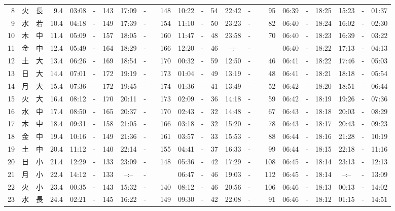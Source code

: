 \documentclass[12pt,a4j]{jsarticle}
\begin{document}
\begin{table}[htbp]
\begin{center}
{\begin{tabular}{|rc|cr|ccrccr|ccrccr|ccc|ccc|}
 8 & 火 & 長 &  9.4 &  03:08 &-& 143 &  17:09 &-& 148 &  10:22 &-&  54 &  22:42 &-&  95 & 06:39 & -& 18:25 & 15:23 & -& 01:37 \\
 9 & 水 & 若 & 10.4 &  04:18 &-& 149 &  17:39 &-& 154 &  11:10 &-&  50 &  23:23 &-&  82 & 06:40 & -& 18:24 & 16:02 & -& 02:30 \\
10 & 木 & 中 & 11.4 &  05:09 &-& 157 &  18:05 &-& 160 &  11:47 &-&  48 &  23:58 &-&  70 & 06:40 & -& 18:23 & 16:39 & -& 03:22 \\
11 & 金 & 中 & 12.4 &  05:49 &-& 164 &  18:29 &-& 166 &  12:20 &-&  46 &  --:-- &-&~~~~~ & 06:40 & -& 18:22 & 17:13 & -& 04:13 \\
12 & 土 & 大 & 13.4 &  06:26 &-& 169 &  18:54 &-& 170 &  00:32 &-&  59 &  12:50 &-&  46 & 06:41 & -& 18:22 & 17:46 & -& 05:03 \\
13 & 日 & 大 & 14.4 &  07:01 &-& 172 &  19:19 &-& 173 &  01:04 &-&  49 &  13:19 &-&  48 & 06:41 & -& 18:21 & 18:18 & -& 05:54 \\
14 & 月 & 大 & 15.4 &  07:36 &-& 172 &  19:45 &-& 174 &  01:36 &-&  41 &  13:49 &-&  52 & 06:42 & -& 18:20 & 18:51 & -& 06:44 \\
15 & 火 & 大 & 16.4 &  08:12 &-& 170 &  20:11 &-& 173 &  02:09 &-&  36 &  14:18 &-&  59 & 06:42 & -& 18:19 & 19:26 & -& 07:36 \\
16 & 水 & 中 & 17.4 &  08:50 &-& 165 &  20:37 &-& 170 &  02:43 &-&  32 &  14:48 &-&  67 & 06:43 & -& 18:18 & 20:03 & -& 08:29 \\
17 & 木 & 中 & 18.4 &  09:31 &-& 158 &  21:05 &-& 166 &  03:18 &-&  32 &  15:20 &-&  78 & 06:43 & -& 18:17 & 20:43 & -& 09:23 \\
18 & 金 & 中 & 19.4 &  10:16 &-& 149 &  21:36 &-& 161 &  03:57 &-&  33 &  15:53 &-&  88 & 06:44 & -& 18:16 & 21:28 & -& 10:19 \\
19 & 土 & 中 & 20.4 &  11:12 &-& 140 &  22:14 &-& 155 &  04:41 &-&  37 &  16:33 &-&  99 & 06:44 & -& 18:15 & 22:18 & -& 11:16 \\
20 & 日 & 小 & 21.4 &  12:29 &-& 133 &  23:09 &-& 148 &  05:36 &-&  42 &  17:29 &-& 108 & 06:45 & -& 18:14 & 23:13 & -& 12:13 \\
21 & 月 & 小 & 22.4 &  14:12 &-& 133 &  --:-- &-&~~~~~ &  06:47 &-&  46 &  19:03 &-& 112 & 06:45 & -& 18:14 & --:-- & -& 13:09 \\
22 & 火 & 小 & 23.4 &  00:35 &-& 143 &  15:32 &-& 140 &  08:12 &-&  46 &  20:56 &-& 106 & 06:46 & -& 18:13 & 00:13 & -& 14:02 \\
23 & 水 & 長 & 24.4 &  02:21 &-& 145 &  16:22 &-& 149 &  09:30 &-&  42 &  22:08 &-&  91 & 06:46 & -& 18:12 & 01:15 & -& 14:51 \\

\end{tabular}}
\end{center}
\end{table}
\end{document}
